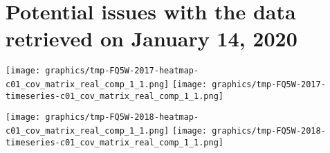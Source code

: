 
\section{Potential issues with the data retrieved on January 14, 2020}
\setcounter{theorem}{0}

\renewcommand{\theenumi}{\roman{enumi}}
\renewcommand{\labelenumi}{\textnormal{(\theenumi)}$\;\;$}


\begin{center}
\begin{minipage}{7.0in}
	\begin{center}
	\texttt{[image: graphics/tmp-FQ5W-2017-heatmap-c01\_cov\_matrix\_real\_comp\_1\_1.png]}
	\vskip 0.1cm
	\texttt{[image: graphics/tmp-FQ5W-2017-timeseries-c01\_cov\_matrix\_real\_comp\_1\_1.png]}
	\end{center}
\end{minipage}
\end{center}


\begin{center}
\begin{minipage}{7.0in}
	\begin{center}
	\texttt{[image: graphics/tmp-FQ5W-2018-heatmap-c01\_cov\_matrix\_real\_comp\_1\_1.png]}
	\vskip 0.1cm
	\texttt{[image: graphics/tmp-FQ5W-2018-timeseries-c01\_cov\_matrix\_real\_comp\_1\_1.png]}
	\end{center}
\end{minipage}
\end{center}


\renewcommand{\theenumi}{\roman{enumi}}
\renewcommand{\labelenumi}{\textnormal{(\theenumi)}$\;\;$}

